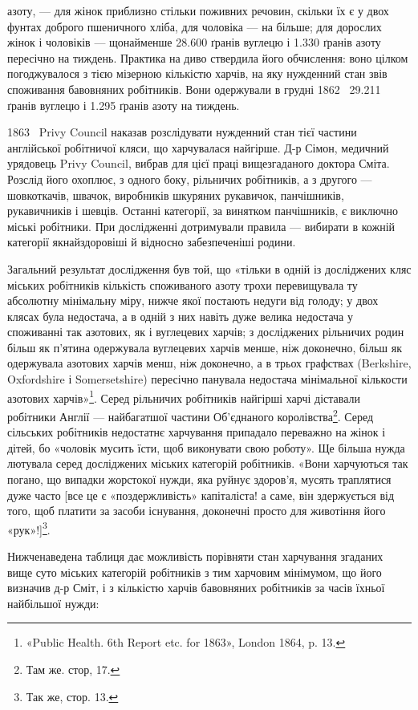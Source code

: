 \parcont{}  %
азоту, — для жінок приблизно стільки поживних речовин,
скільки їх є у двох фунтах доброго пшеничного хліба, для чоловіка — на
 більше; для дорослих жінок і чоловіків — щонайменше
\num{28.600} ґранів вуглецю і \num{1.330} ґранів азоту пересічно на тиждень.
Практика на диво ствердила його обчислення: воно цілком погоджувалося
з тією мізерною кількістю харчів, на яку нужденний
стан звів споживання бавовняних робітників. Вони одержували
в грудні 1862~ \num{29.211} ґранів вуглецю і \num{1.295} ґранів азоту
на тиждень.

1863~ Privy Council наказав розслідувати нужденний стан
тієї частини англійської робітничої кляси, що харчувалася найгірше.
Д-р Сімон, медичний урядовець Privy Council, вибрав
для цієї праці вищезгаданого доктора Сміта. Розслід його охоплює,
з одного боку, рільничих робітників, а з другого — шовкоткачів,
швачок, виробників шкуряних рукавичок, панчішників,
рукавичників і шевців. Останні категорії, за винятком панчішників,
є виключно міські робітники. При дослідженні дотримували
правила — вибирати в кожній категорії якнайздоровіші
й відносно забезпеченіші родини.

Загальний результат дослідження був той, що «тільки в
одній із досліджених кляс міських робітників кількість споживаного
азоту трохи перевищувала ту абсолютну мінімальну
міру, нижче якої постають недуги від голоду; у двох клясах
була недостача, а в одній з них навіть дуже велика недостача
у споживанні так азотових, як і вуглецевих харчів; з досліджених
рільничих родин більш як п’ятина одержувала вуглецевих
харчів менше, ніж доконечно, більш як  одержувала
азотових харчів менш, ніж доконечно, а в трьох графствах
(Berkshire, Oxfordshire і Somersetshire) пересічно панувала недостача
мінімальної кількости азотових харчів»\footnote{
«Public Health. 6th Report etc. for 1863», London 1864, p. 13.
}. Серед рільничих
робітників найгірші харчі діставали робітники Англії —
найбагатшої частини Об’єднаного королівства\footnote{
Там же. стор, 17.
}. Серед сільських
робітників недостатнє харчування припадало переважно
на жінок і дітей, бо «чоловік мусить їсти, щоб виконувати свою
роботу». Ще більша нужда лютувала серед досліджених міських
категорій робітників. «Вони харчуються так погано, що випадки
жорстокої нужди, яка руйнує здоров’я, мусять траплятися дуже
часто [все це є «поздержливість» капіталіста! а саме, він здержується
від того, щоб платити за засоби існування, доконечні
просто для животіння його «рук»!]\footnote{
Так же, стор. 13.
}.

Нижченаведена таблиця дає можливість порівняти стан харчування
згаданих вище суто міських категорій робітників з
тим харчовим мінімумом, що його визначив д-р Сміт, і з
кількістю харчів бавовняних робітників за часів їхньої найбільшої
нужди:
\parbreak{}  %
